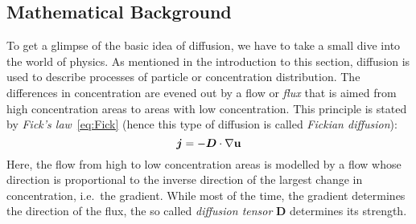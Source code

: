 \subsection{Mathematical Background}
To get a glimpse of the basic idea of diffusion, we have to take a small dive into the world of
physics.
As mentioned in the introduction to this section, diffusion is used to describe processes of
particle or concentration distribution. The differences in concentration are evened out by a flow
or \textit{flux} that is aimed from high concentration areas to areas with low concentration. This
principle is stated by \textit{Fick's law}~\eqref{eq:Fick} (hence this type of diffusion is called \textit{Fickian
diffusion}):
\begin{equation}
    \boldsymbol j = -\boldsymbol D\cdot\mathbf{\nabla} \mathbf{u}\label{eq:Fick}
\end{equation}
Here, the flow from high to low concentration areas is modelled by a flow whose direction is
proportional to the inverse direction of the largest change in concentration, i.e.\ the gradient.
While most of the time, the gradient determines the direction of the flux, the so called
\textit{diffusion tensor} $\boldsymbol D$ determines its strength. \\

